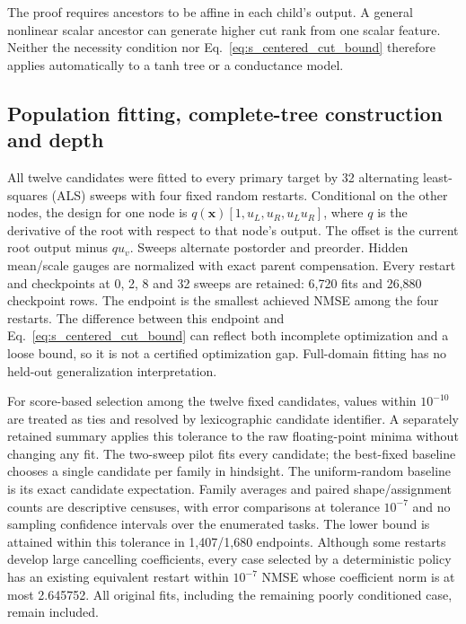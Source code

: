 The proof requires ancestors to be affine in each child's output. A general
nonlinear scalar ancestor can generate higher cut rank from one scalar
feature. Neither the necessity condition nor Eq.~\ref{eq:s_centered_cut_bound}
therefore applies automatically to a tanh tree or a conductance model.

\subsection{Population fitting, complete-tree construction and depth}
\label{note:constructive_morphology}

All twelve candidates were fitted to every primary target by 32 alternating
least-squares (ALS) sweeps with four fixed random restarts. Conditional on the
other nodes, the design for one node is
$q(\bm x)[1,u_L,u_R,u_Lu_R]$, where $q$ is the derivative of the root with
respect to that node's output. The offset is the current root output minus
$q u_v$. Sweeps alternate postorder and preorder. Hidden mean/scale gauges
are normalized with exact parent compensation. Every restart and checkpoints
at 0, 2, 8 and 32 sweeps are retained: 6,720 fits and 26,880 checkpoint rows.
The endpoint is the smallest achieved NMSE among the four restarts. The difference between this endpoint and
Eq.~\ref{eq:s_centered_cut_bound} can reflect both incomplete optimization
and a loose bound, so it is not a certified optimization gap. Full-domain fitting
has no held-out generalization interpretation.

For score-based selection among the twelve fixed candidates, values within
$10^{-10}$ are treated as ties and resolved by lexicographic candidate
identifier. A separately retained summary applies this tolerance to the raw
floating-point minima without changing any fit.
The two-sweep pilot fits every candidate; the best-fixed baseline chooses a
single candidate per family in hindsight. The uniform-random baseline is its
exact candidate expectation. Family averages and paired shape/assignment
counts are descriptive censuses, with error comparisons at tolerance
$10^{-7}$ and no sampling confidence intervals over the enumerated tasks.
The lower bound is attained within this tolerance in 1,407/1,680 endpoints.
Although some restarts develop large cancelling coefficients, every case
selected by a deterministic policy has an existing equivalent restart within
$10^{-7}$ NMSE whose coefficient norm is at most 2.645752. All original fits,
including the remaining poorly conditioned case, remain included.

